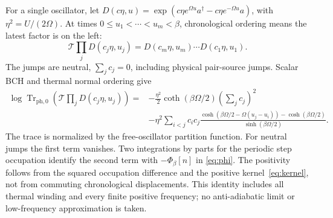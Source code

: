 \documentclass[11pt]{article}
\theoremstyle{plain}
\theoremstyle{remark}
\DeclareMathOperator{\Tr}{Tr}
\begin{document}
For a single oscillator, let $D(c\eta,u)=
\exp(c\eta e^{\Omega u}a^\dagger-c\eta e^{-\Omega u}a)$, with
$\eta^2=U/(2\Omega)$. At times $0\le u_1<\cdots<u_m<\beta$, chronological
ordering means the latest factor is on the left:
\[
\mathcal T\prod_jD(c_j\eta,u_j)
=D(c_m\eta,u_m)\cdots D(c_1\eta,u_1).
\]
The jumps are neutral, $\sum_jc_j=0$, including physical pair-source jumps.
Scalar BCH and thermal normal ordering give
\begin{equation}\label{eq:oscidentity}
\begin{split}
\log\Tr_{\mathrm{ph},0}\!\left(\mathcal T\prod_jD(c_j\eta,u_j)\right)
={}&-\frac{\eta^2}{2}\coth(\beta\Omega/2)\left(\sum_jc_j\right)^2\\
&-\eta^2\sum_{i<j}c_ic_j
\frac{\cosh(\beta\Omega/2-\Omega(u_j-u_i))
-\cosh(\beta\Omega/2)}{\sinh(\beta\Omega/2)}.
\end{split}
\end{equation}
The trace is normalized by the free-oscillator partition function.
For neutral jumps the first term vanishes. Two integrations by parts for the
periodic step occupation identify the second term with $-\Phi_\beta[n]$ in
\eqref{eq:phi}. The positivity follows from the squared occupation difference
and the positive kernel~\eqref{eq:kernel}, not from commuting chronological
displacements. This identity includes all thermal winding and every
finite positive frequency; no anti-adiabatic limit or low-frequency
approximation is taken.



\end{document}
